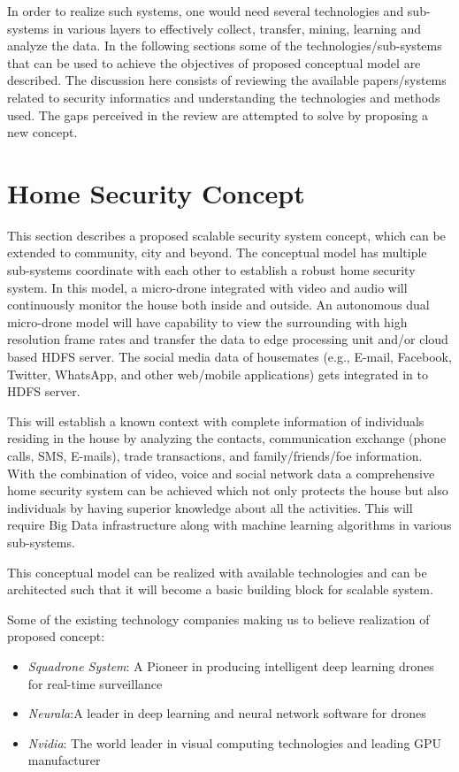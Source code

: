 \documentclass[sigconf]{acmart}
\begin{document}
In order to realize such systems, one would need several technologies and sub-systems in various layers to effectively collect, transfer, mining, learning and analyze the data. In the following sections some of the technologies/sub-systems that can be used to achieve the objectives of proposed conceptual model are described.
The discussion here consists of reviewing the available papers/systems related to security informatics and understanding the technologies and methods used. The gaps perceived in the review are attempted to solve by proposing a new concept. 

\section{Home Security Concept}
This section describes a proposed scalable security system concept, which can be extended to community, city and beyond.  The conceptual model has multiple sub-systems coordinate with each other to establish a robust home security system. In this model, a micro-drone integrated with video and audio will continuously monitor the house both inside and outside. An autonomous dual micro-drone model will have capability to view the surrounding with high resolution frame rates and transfer the data to edge processing unit and/or cloud based HDFS server. The social media data of housemates (e.g., E-mail, Facebook, Twitter, WhatsApp, and other web/mobile applications) gets integrated in to HDFS server.

This will establish a known context with complete information of individuals residing in the house by analyzing the contacts, communication exchange (phone calls, SMS, E-mails), trade transactions, and family/friends/foe information. With the combination of video, voice and social network data a comprehensive home security system can be achieved which not only protects the house but also individuals by having superior knowledge about all the activities. This will require Big Data infrastructure along with machine learning algorithms in various sub-systems.

This conceptual model can be realized with available technologies and can be architected such that it will become a basic building block for scalable system.

Some of the existing technology companies making us to believe realization of proposed concept:
 \begin{itemize}
    \item \textit{Squadrone System}: A Pioneer in producing intelligent deep learning drones for real-time surveillance
    \item \textit{Neurala}:A leader in deep learning and neural network software for drones
    \item \textit{Nvidia}: The world leader in visual computing technologies and leading GPU manufacturer
 \end{itemize}
\end{document}
